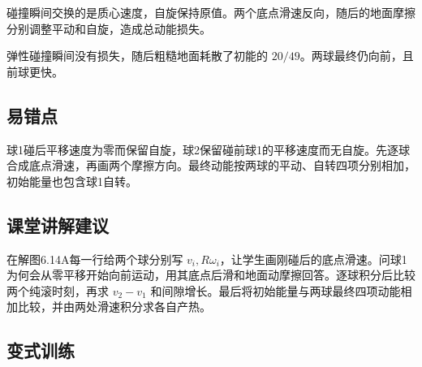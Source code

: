 \documentclass[UTF8,fontset=fandol,a4paper,11pt]{ctexart}
\begin{document}
碰撞瞬间交换的是质心速度，自旋保持原值。两个底点滑速反向，随后的地面摩擦分别调整平动和自旋，造成总动能损失。

弹性碰撞瞬间没有损失，随后粗糙地面耗散了初能的 $20/49$。两球最终仍向前，且前球更快。



\subsection*{易错点}

球1碰后平移速度为零而保留自旋，球2保留碰前球1的平移速度而无自旋。先逐球合成底点滑速，再画两个摩擦方向。最终动能按两球的平动、自转四项分别相加，初始能量也包含球1自转。



\subsection*{课堂讲解建议}

在解图6.14A每一行给两个球分别写 $v_i,R\omega_i$，让学生画刚碰后的底点滑速。问球1为何会从零平移开始向前运动，用其底点后滑和地面动摩擦回答。逐球积分后比较两个纯滚时刻，再求 $v_2-v_1$ 和间隙增长。最后将初始能量与两球最终四项动能相加比较，并由两处滑速积分求各自产热。




\subsection*{变式训练}
\end{document}

